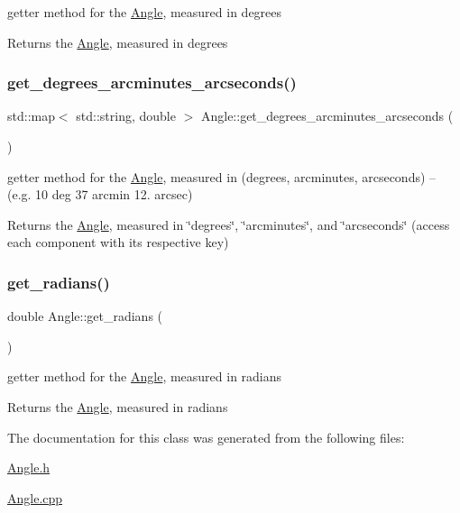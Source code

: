 getter method for the \mbox{\hyperlink{classAngle}{Angle}}, measured in degrees 

\begin{DoxyReturn}{Returns}
the \mbox{\hyperlink{classAngle}{Angle}}, measured in degrees 
\end{DoxyReturn}
\mbox{\label{classAngle_a5425dc27480fec42fb3046378a70920e}} 
\subsubsection{\texorpdfstring{get\+\_\+degrees\+\_\+arcminutes\+\_\+arcseconds()}{get\_degrees\_arcminutes\_arcseconds()}}
{\footnotesize\ttfamily std\+::map$<$ std\+::string, double $>$ Angle\+::get\+\_\+degrees\+\_\+arcminutes\+\_\+arcseconds (\begin{DoxyParamCaption}{ }\end{DoxyParamCaption})}



getter method for the \mbox{\hyperlink{classAngle}{Angle}}, measured in (degrees, arcminutes, arcseconds) -- (e.\+g. 10 deg 37 arcmin 12. arcsec) 

\begin{DoxyReturn}{Returns}
the \mbox{\hyperlink{classAngle}{Angle}}, measured in \char`\"{}degrees\char`\"{}, \char`\"{}arcminutes\char`\"{}, and \char`\"{}arcseconds\char`\"{} (access each component with its respective key) 
\end{DoxyReturn}
\mbox{\label{classAngle_af8f8715184904ea14d1e951be1f8d60c}} 
\subsubsection{\texorpdfstring{get\+\_\+radians()}{get\_radians()}}
{\footnotesize\ttfamily double Angle\+::get\+\_\+radians (\begin{DoxyParamCaption}{ }\end{DoxyParamCaption})}



getter method for the \mbox{\hyperlink{classAngle}{Angle}}, measured in radians 

\begin{DoxyReturn}{Returns}
the \mbox{\hyperlink{classAngle}{Angle}}, measured in radians 
\end{DoxyReturn}


The documentation for this class was generated from the following files\+:\begin{DoxyCompactItemize}
\item 
\mbox{\hyperlink{Angle_8h}{Angle.\+h}}\item 
\mbox{\hyperlink{Angle_8cpp}{Angle.\+cpp}}\end{DoxyCompactItemize}
